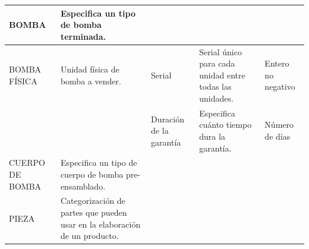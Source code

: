 \documentclass[]{report}
\begin{document}
\begin{center}
\begin{tabular}{| p{2.5cm} | p{4.5cm} | p{2cm} | p{5cm} | p{3cm}|}
			
			BOMBA & Especifica un tipo de bomba terminada. & & &\\ \cline{3-5}
			\hline
			
			BOMBA FÍSICA & Unidad física de bomba a vender. &
			Serial & Serial único para cada unidad entre todas las unidades.& Entero no negativo \\ \cline{3-5}
			&& Duración de la garantía & Especifica cuánto tiempo dura la garantía.& Número de días \\ \cline{3-5}
			\hline
			CUERPO DE BOMBA & Especifica un tipo de cuerpo de bomba pre-ensamblado. & & &\\ \cline{3-5}
			\hline
			
			PIEZA & Categorización de partes que pueden usar en la elaboración de un producto. & & &\\ \cline{3-5}
			\hline
	
		\end{tabular}
	\end{center}	
\end{document}
